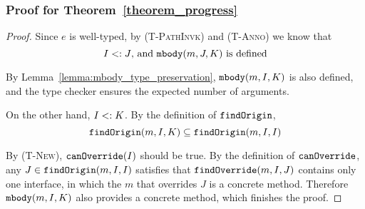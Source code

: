\subsubsection{Proof for Theorem~\ref{theorem_progress}}
\begin{proof}
	
Since $e$ is well-typed, by \textsc{(T-PathInvk)} and \textsc{(T-Anno)} we know that
$$I <: J\textrm{, and }\texttt{mbody}(m, J, K) \textrm{ is defined}$$

By Lemma~\ref{lemma:mbody_type_preservation}, $\texttt{mbody}(m, I, K)$ is also defined, and the type checker ensures the expected number of arguments.

On the other hand, $I <: K$. By the definition of $\texttt{findOrigin}$, $$\texttt{findOrigin}(m, I, K) \subseteq \texttt{findOrigin}(m, I, I)$$

By \textsc{(T-New)}, $\texttt{canOverride}(I)$ should be true. By the definition of $\texttt{canOverride}$, any $J\in\texttt{findOrigin}(m, I, I)$ satisfies that
$\texttt{findOverride}(m, I, J)$ contains only one interface, in which the $m$ that overrides $J$ is a concrete method. Therefore $\texttt{mbody}(m, I, K)$ also provides a concrete method, which finishes the proof.
\end{proof}